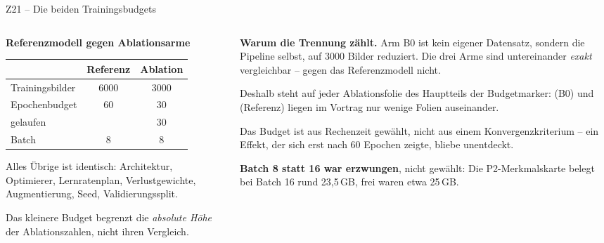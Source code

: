 \documentclass[14pt,aspectratio=169]{beamer}
\begin{document}
\begin{frame}{Z21 -- Die beiden Trainingsbudgets}
\zusatzdicht
\begin{columns}[T,onlytextwidth]
\begin{column}{0.44\textwidth}
\textbf{Referenzmodell gegen Ablationsarme}
\begin{center}
\begin{tabular}{@{}lcc@{}}
\toprule
 & \textbf{Referenz} & \textbf{Ablation} \\
\midrule
Trainingsbilder & 6000 & 3000 \\
Epochenbudget & 60 & 30 \\
gelaufen & \zrefEpochen{} & 30 \\
Batch & 8 & 8 \\
\bottomrule
\end{tabular}
\end{center}
\smallskip

Alles Übrige ist identisch: Architektur, Optimierer, Lernratenplan,
Verlustgewichte, Augmentierung, Seed, Validierungssplit.
\smallskip

{\color{warn}Das kleinere Budget begrenzt die \emph{absolute Höhe} der
Ablationszahlen, nicht ihren Vergleich.}
\end{column}
\begin{column}{0.53\textwidth}
\textbf{Warum die Trennung zählt.} Arm B0 ist kein eigener Datensatz, sondern
die Pipeline selbst, auf 3000 Bilder reduziert. Die drei Arme sind
untereinander \emph{exakt} vergleichbar -- gegen das Referenzmodell nicht.
\smallskip

{\color{warn}Deshalb steht auf jeder Ablationsfolie des Hauptteils der
Budgetmarker: \zBZeroTestMap{} (B0) und \zrefTestMap{} (Referenz) liegen im
Vortrag nur wenige Folien auseinander.}
\smallskip

Das Budget ist aus Rechenzeit gewählt, nicht aus einem Konvergenzkriterium --
ein Effekt, der sich erst nach 60 Epochen zeigte, bliebe unentdeckt.
\smallskip

\textbf{Batch 8 statt 16 war erzwungen}, nicht gewählt: Die
P2-Merkmalskarte belegt bei Batch 16 rund 23{,}5\,GB, frei waren etwa
25\,GB.
\end{column}
\end{columns}
\end{frame}
\end{document}
